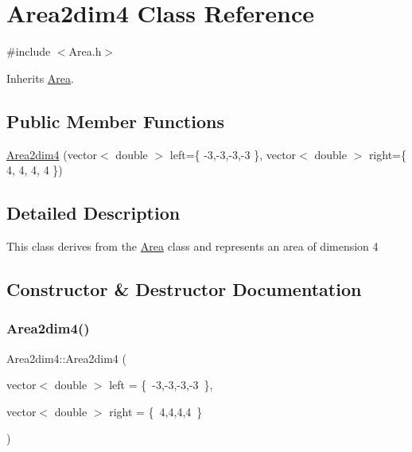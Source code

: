 \hypertarget{class_area2dim4}{}\section{Area2dim4 Class Reference}
\label{class_area2dim4}


{\ttfamily \#include $<$Area.\+h$>$}



Inherits \hyperlink{class_area}{Area}.

\subsection*{Public Member Functions}
\begin{DoxyCompactItemize}
\item 
\hyperlink{class_area2dim4_a5bbd627d2e0a49725bd9ced1630f1257}{Area2dim4} (vector$<$ double $>$ left=\{ -\/3,-\/3,-\/3,-\/3 \}, vector$<$ double $>$ right=\{ 4, 4, 4, 4 \})
\end{DoxyCompactItemize}


\subsection{Detailed Description}
This class derives from the \hyperlink{class_area}{Area} class and represents an area of dimension 4 

\subsection{Constructor \& Destructor Documentation}
\mbox{\label{class_area2dim4_a5bbd627d2e0a49725bd9ced1630f1257}} 
\subsubsection{\texorpdfstring{Area2dim4()}{Area2dim4()}}
{\footnotesize\ttfamily Area2dim4\+::\+Area2dim4 (\begin{DoxyParamCaption}\item[{vector$<$ double $>$}]{left = {\ttfamily \{~-\/3,-\/3,-\/3,-\/3~\}},  }\item[{vector$<$ double $>$}]{right = {\ttfamily \{~4,4,4,4~\}} }\end{DoxyParamCaption})\hspace{0.3cm}{\ttfamily [inline]}}

